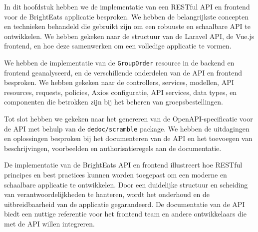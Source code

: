 In dit hoofdstuk hebben we de implementatie van een RESTful API en frontend voor de BrightEats applicatie besproken. We hebben de belangrijkste concepten en technieken behandeld die gebruikt zijn om een robuuste en schaalbare API te ontwikkelen. We hebben gekeken naar de structuur van de Laravel API, de Vue.js frontend, en hoe deze samenwerken om een volledige applicatie te vormen.

\bigskip

We hebben de implementatie van de \texttt{GroupOrder} resource in de backend en frontend geanalyseerd, en de verschillende onderdelen van de API en frontend besproken. We hebben gekeken naar de controllers, services, modellen, API resources, requests, policies, Axios configuratie, API services, data types, en componenten die betrokken zijn bij het beheren van groepsbestellingen.

\bigskip

Tot slot hebben we gekeken naar het genereren van de OpenAPI-specificatie voor de API met behulp van de \texttt{dedoc/scramble} package. We hebben de uitdagingen en oplossingen besproken bij het documenteren van de API en het toevoegen van beschrijvingen, voorbeelden en authorisatieregels aan de documentatie.

\bigskip

De implementatie van de BrightEats API en frontend illustreert hoe RESTful principes en best practices kunnen worden toegepast om een moderne en schaalbare applicatie te ontwikkelen. Door een duidelijke structuur en scheiding van verantwoordelijkheden te hanteren, wordt het onderhoud en de uitbreidbaarheid van de applicatie gegarandeerd. De documentatie van de API biedt een nuttige referentie voor het frontend team en andere ontwikkelaars die met de API willen integreren.
